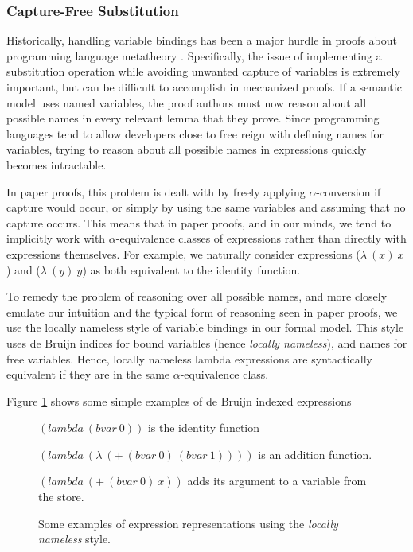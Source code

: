 \subsubsection{Capture-Free Substitution}
Historically, handling variable bindings has been a major hurdle in proofs about programming language metatheory \cite{chargueraud_locally_2012}. Specifically, the issue of implementing a substitution operation while avoiding unwanted capture of variables is extremely important, but can be difficult to accomplish in mechanized proofs. If a semantic model uses named variables, the proof authors must now reason about all possible names in every relevant lemma that they prove. Since programming languages tend to allow developers close to free reign with defining names for variables, trying to reason about all possible names in expressions quickly becomes intractable. 

In paper proofs, this problem is dealt with by freely applying $\alpha$-conversion if capture would occur, or simply by using the same variables and assuming that no capture occurs. This means that in paper proofs, and in our minds, we tend to implicitly work with $\alpha$-equivalence classes of expressions rather than directly with expressions themselves. For example, we naturally consider expressions ($\lambda\ (x)\ x$) and ($\lambda\ (y)\ y$) as both equivalent to the identity function.

To remedy the problem of reasoning over all possible names, and more closely emulate our intuition and the typical form of reasoning seen in paper proofs, we use the locally nameless style of variable bindings in our formal model. This style uses de Bruijn indices for bound variables (hence \textit{locally nameless}), and names for free variables. Hence, locally nameless lambda expressions are syntactically equivalent if they are in the same $\alpha$-equivalence class.

Figure \ref{fig:ln_ex} shows some simple examples of de Bruijn indexed expressions
\begin{figure}
$(lambda\ (bvar\ 0))$ is the identity function

$(lambda\ (\lambda\ (+\ (bvar\ 0)\ (bvar\ 1))))$ is an addition function.

$(lambda\ (+\ (bvar\ 0)\ x))$ adds its argument to a variable from the store.

    \caption{Some examples of expression representations using the \textit{locally nameless} style.}
    \label{fig:ln_ex}
\end{figure}

